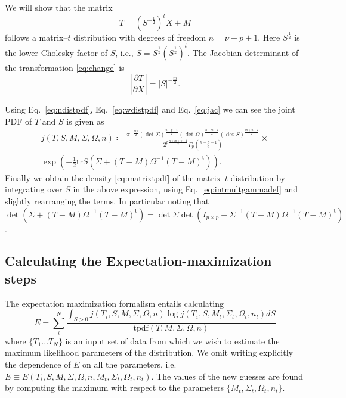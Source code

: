 \documentclass[english,listof=totoc]{scrartcl}
\begin{document}
We will show that the matrix
\begin{equation}
T=(S^{-\frac{1}{2}})^{t}X+M\label{eq:change}
\end{equation}
follows a matrix--$t$ distribution with degrees of freedom $n=\nu-p+1$. Here $S^{\frac{1}{2}}$ is the lower Cholesky factor of $S$, i.e., $S=S^{\frac{1}{2}}(S^{\frac{1}{2}})^t$. The Jacobian determinant of the transformation \eqref{eq:change} is
\begin{equation}
\left|\frac{\partial T}{\partial X}\right|=|S|^{-\frac{m}{2}}.\label{eq:jac}
\end{equation}

Using Eq.~\eqref{eq:ndistpdf}, Eq.~\eqref{eq:wdistpdf} and Eq.~\eqref{eq:jac} we can see the joint PDF of $T$ and $S$ is given as
\begin{equation}
\begin{split}j(T,S,M,\Sigma,\Omega,n)\coloneqq\frac{\pi^{-\frac{mp}{2}}(\det\Sigma)^{\frac{n+p-1}{2}}(\det\Omega)^{\frac{n+m-2}{2}}(\det S)^{\frac{m+n-2}{2}}}{2^{p\frac{n+m+p-1}{2}}\Gamma_{p}(\frac{n+p-1}{2})}\times\\
\exp\left(-\frac{1}{2}\textrm{tr}S(\Sigma+(T-M)\Omega^{-1}(T-M)^{\textrm{t}})\right).
\end{split}
\label{eq:jointpdf}
\end{equation}
Finally we obtain the density \eqref{eq:matrixtpdf} of the matrix--$t$ distribution
by integrating over $S$ in the above expression, using Eq.~\eqref{eq:intmultgammadef} and slightly
rearranging the terms. In particular noting that
$\det(\Sigma+(T-M)\Omega^{-1}(T-M)^{\textrm{t}})=\det\Sigma\det(I_{p\times
p}+\Sigma^{-1}(T-M)\Omega^{-1}(T-M)^{\textrm{t}})$.

\subsection{Calculating the Expectation-maximization steps}

The expectation maximization formalism entails calculating 
\begin{equation}
E=\sum_{i}^{N}\frac{\int_{S>0}j(T_{i},S,M,\Sigma,\Omega,n)\log j(T_{i},S,M_{t},\Sigma_{t},\Omega_{t},n_{t})dS}{\textrm{tpdf}(T,M,\Sigma,\Omega,n)}\label{eq:expdef}
\end{equation}
where $\{T_{1}...T_{N}\}$ is an input set of data from which we wish
to estimate the maximum likelihood parameters of the distribution.
We omit writing explicitly the dependence of $E$ on all the parameters,
i.e. $E\equiv E(T_{i},S,M,\Sigma,\Omega,n,M_{t},\Sigma_{t},\Omega_{t},n_{t})$.
The values of the new guesses are found by computing the maximum with
respect to the parameters $\{M_{t},\Sigma_{t},\Omega_{t},n_{t}\}$. 
\end{document}
